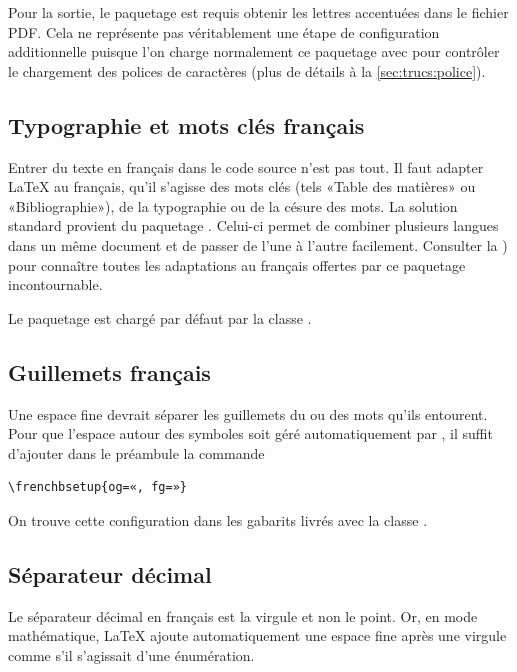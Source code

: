 Pour la sortie, le paquetage  \citep{fontspec} est
requis obtenir les lettres accentuées dans le fichier PDF. Cela ne
représente pas véritablement une étape de configuration additionnelle
puisque l'on charge normalement ce paquetage avec {\XeLaTeX} pour
contrôler le chargement des polices de caractères (plus de détails à
la \autoref{sec:trucs:police}).


\subsection{Typographie et mots clés français}
\label{sec:bases:francais:babel}

Entrer du texte en français dans le code source n'est pas tout. Il
faut adapter {\LaTeX} au français, qu'il s'agisse des mots clés (tels
«Table des matières» ou «Bibliographie»), de la typographie ou de la
césure des mots. La solution standard provient du paquetage
 \citep{babel}. Celui-ci permet de combiner plusieurs
langues dans un même document et de passer de l'une à l'autre
facilement. Consulter la %
) %
pour connaître toutes les adaptations au français offertes par ce
paquetage incontournable.

Le paquetage  est chargé par défaut par la classe
.

\subsection{Guillemets français}
\label{sec:bases:francais:guillemets}

Une espace fine devrait séparer les guillemets du ou des mots qu'ils
entourent. Pour que l'espace autour des symboles soit géré
automatiquement par , il suffit d'ajouter dans le préambule
la commande
\begin{lstlisting}
\frenchbsetup{og=«, fg=»}
\end{lstlisting}
On trouve cette configuration dans les gabarits livrés avec la classe
.

\subsection{Séparateur décimal}
\label{sec:bases:francais:virgule}

Le séparateur décimal en français est la virgule et non le point. Or,
en mode mathématique, LaTeX ajoute automatiquement une espace fine
après une virgule comme s'il s'agissait d'une énumération.

